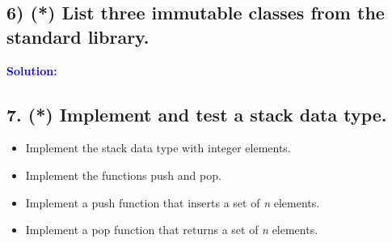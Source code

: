 \documentclass{article}
\begin{document}
\subsection*{6) (*) List three immutable classes from the standard library.}
\indent \textbf{\textcolor{blue}{Solution:}} \\


\subsection*{7. (*) Implement and test a stack data type.}
\begin{itemize}
    \item Implement the stack data type with integer elements.
    \item Implement the functions push and pop.
    \item Implement a push function that inserts a set of \textit{n} elements.
    \item Implement a pop function that returns a set of \textit{n} elements.
\end{itemize}
\end{document}
